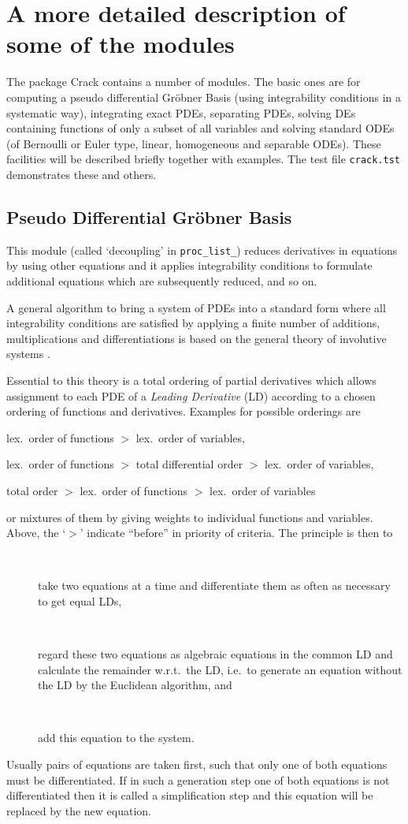 \documentclass[12pt]{article}
\begin{document}
\section{A more detailed description of some of the modules}
The package {\sc Crack} contains a number of modules. 
The basic ones are for computing a pseudo differential Gr\"{o}bner
Basis (using integrability conditions in a systematic way), integrating
exact PDEs, separating PDEs, solving DEs containing functions of only
a subset of all variables and solving standard ODEs (of Bernoulli or
Euler type, linear, homogeneous and separable ODEs). These facilities
will be described briefly together with examples. The test file
{\tt crack.tst} demonstrates these and others.

\subsection{Pseudo Differential Gr\"{o}bner Basis}
This module (called `decoupling' in {\tt proc\_list\_})
reduces derivatives in equations by using other equations and it applies
integrability conditions to formulate additional equations which are
subsequently reduced, and so on.

A general algorithm to bring a system of PDEs into a standard form
where all integrability conditions are satisfied by applying
a finite number of additions, multiplications and differentiations
is based on the general theory of involutive systems \cite{Riq,Th,Ja}.

Essential to this theory is a total ordering of partial derivatives
which allows assignment to each PDE of a {\em Leading Derivative} 
(LD) according to a chosen ordering of functions
and derivatives. Examples for possible orderings are 
\begin{description}
\item lex.\ order of functions $>$ lex.\ order of variables,
\item lex.\ order of functions $>$ total differential order $>$ lex.\ 
      order of variables,
\item total order $>$ lex.\ order of functions $>$ lex.\ order of variables
\end{description}
or mixtures of them by giving weights to individual functions and variables.
Above, the `$>$' indicate ``before'' in priority of criteria. The principle
is then to
\begin{description}
\item[\ \ ] take two equations at a time and differentiate them as often as 
necessary to get equal LDs,
\item[\ \ ]  regard these two equations as algebraic equations in
the common LD and calculate the remainder w.r.t.\ the LD, i.e.\ to
generate an equation without the LD by the Euclidean algorithm, and
\item[\ \ ]  add this equation to the system.
\end{description}
Usually pairs of equations are taken first, such that only one 
of both equations must be
differentiated. If in such a generation step one of both equations is not
differentiated then it is called a
simplification step and this equation will be replaced by the new equation.
\end{document}
